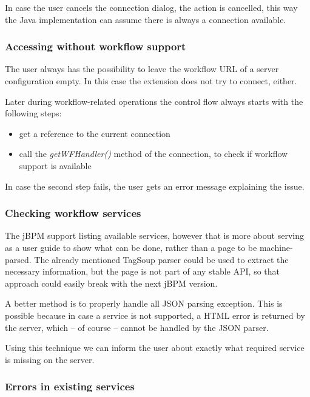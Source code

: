 In case the user cancels the connection dialog, the action is cancelled, this
way the Java implementation can assume there is always a connection available.

\subsubsection*{Accessing without workflow support}

The user always has the possibility to leave the workflow URL of a server
configuration empty. In this case the extension does not try to connect,
either.

Later during workflow-related operations the control flow always starts with the following steps:

\begin{itemize}
\item get a reference to the current connection
\item call the \emph{getWFHandler()} method of the connection, to check if workflow support is available
\end{itemize}

In case the second step fails, the user gets an error message explaining the issue.

\subsubsection*{Checking workflow services}

The jBPM support listing available services, however that is more about serving as
a user guide to show what can be done, rather than a page to be machine-parsed.
The already mentioned TagSoup parser could be used to extract the necessary
information, but the page is not part of any stable API, so that approach could
easily break with the next jBPM version.

A better method is to properly handle all JSON parsing exception. This is
possible because in case a service is not supported, a HTML error is returned
by the server, which -- of course -- cannot be handled by the JSON parser.

Using this technique we can inform the user about exactly what required service
is missing on the server.

\subsubsection*{Errors in existing services}

